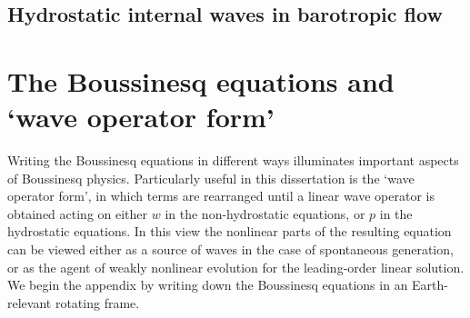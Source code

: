 \documentclass[12pt, oneside]{book}
\begin{document}

\section{Hydrostatic internal waves in barotropic flow} \label{examplesTide}

\appendix

\clearpage
\newcommand{\bOmega}{\boldsymbol{\Omega}}
\chapter{The Boussinesq equations and `wave operator form'}
\label{waveOperatorFormAppendix}

Writing the Boussinesq equations in different ways illuminates important aspects of Boussinesq physics.  Particularly useful in this dissertation is the `wave operator form', in which terms are rearranged until a linear wave operator is obtained acting on either $w$ in the non-hydrostatic equations, or $p$ in the hydrostatic equations.  In this view the nonlinear parts of the resulting equation can be viewed either as a source of waves in the case of spontaneous generation, or as the agent of weakly nonlinear evolution for the leading-order linear solution.  We begin the appendix by writing down the Boussinesq equations in an Earth-relevant rotating frame.
\end{document}
